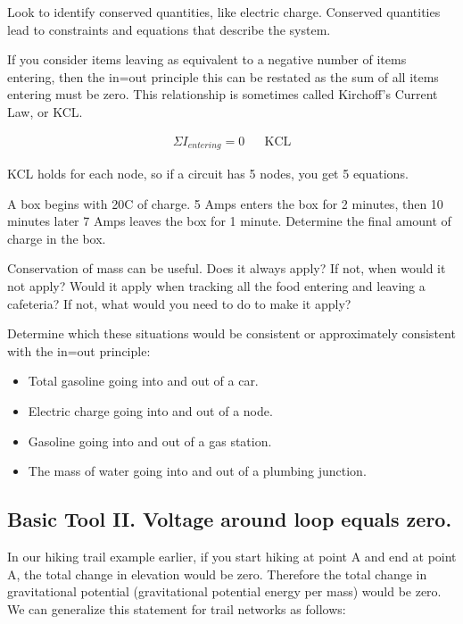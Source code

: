 \begin{bigidea}
Look to identify conserved quantities, like electric charge. Conserved quantities lead to constraints and equations that describe the system.
\end{bigidea}

\par
If you consider items leaving as equivalent to a negative number of items entering, then the in=out principle this can be restated as the sum of all items entering must be zero. This relationship is sometimes called Kirchoff's Current Law, or KCL.
\par
\begin{align*}
\Sigma I_{entering}=0	&&\text{KCL}
\end{align*}

KCL holds for each node, so if a circuit has 5 nodes, you get 5 equations.

\begin{blevel}
A box begins with 20C of charge. 5 Amps enters the box for 2 minutes, then 10 minutes later 7 Amps leaves the box for 1 minute. Determine the final amount of charge in the box.
\end{blevel}

\begin{dlevel}
Conservation of mass can be useful. Does it always apply? If not, when would it not apply? Would it apply when tracking all the food entering and leaving a cafeteria? If not, what would you need to do to make it apply?
\end{dlevel}

\begin{blevel}
Determine which these situations would be consistent or approximately consistent with the in=out principle:
\begin{itemize}
\item Total gasoline going into and out of a car.
\item Electric charge going into and out of a node.
\item Gasoline going into and out of a gas station.
\item The mass of water going into and out of a plumbing junction.
\end{itemize}
\end{blevel}

\subsection{Basic Tool II. Voltage around loop equals zero.}
In our hiking trail example earlier, if you start hiking at point A and end at point A, the total change in elevation would be zero. Therefore the total change in gravitational potential (gravitational potential energy per mass) would be zero. We can generalize this statement for trail networks as follows:
\par

